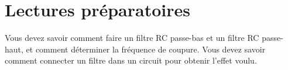 \documentclass[canadien,12pt,oneside,letterpaper]{article}
\begin{document}
%
%
%
%


\section{Lectures préparatoires}
Vous devez savoir comment faire un filtre RC passe-bas et un filtre RC passe-haut, et comment déterminer la fréquence de coupure.  Vous devez savoir comment connecter un filtre dans un circuit pour obtenir l'effet voulu. 
\end{document}
